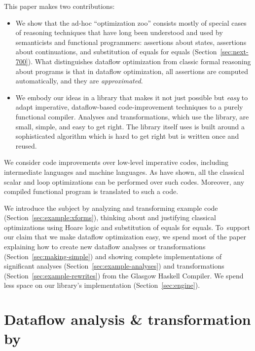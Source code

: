 \documentclass[blockstyle,preprint,natbib,nocopyrightspace]{sigplanconf}
\newcommand\secref[1]{Section~\ref{sec:#1}}
\begin{document}
This paper makes two contributions:
\begin{itemize}
\item
We show that the ad-hoc ``optimization zoo'' consists mostly of special
cases of reasoning techniques that have long been understood and used
by semanticists and functional programmers:
assertions about states, assertions about continuations, and
substitution of equals for equals (\secref{next-700}).
What distinguishes dataflow optimization from classic formal reasoning
about programs is that in dataflow optimization, all assertions are
computed automatically, and they are
\emph{approximated}. 
\item
We embody our ideas in a library that makes it not just
possible but \emph{easy} to adapt imperative, dataflow-based
code-improvement techniques to a purely functional compiler.
Analyses and transformations, which use the library,
are small, simple, and easy to get right.
The library itself
\ifpagetuning uses \else is built around \fi
 a sophisticated algorithm which is
hard to get right but is 
written once and reused.
\end{itemize}

We consider code improvements over low-level
imperative codes, including intermediate languages and machine
languages.
As \citet{benitez-davidson:portable-optimizer} have shown, all the
classical scalar and loop optimizations can be performed over such
codes.
Moreover, any compiled functional program is
translated to such a code.


We introduce the subject by analyzing and transforming example code 
(\secref{example:xforms}),
thinking about and justifying classical optimizations using
Hoare logic and substitution of equals for equals.
To~support our claim that we make dataflow optimization easy, 
we spend most of the paper explaining how
to create new dataflow analyses or transformations
(\secref{making-simple}) and showing complete implementations of significant
analyses (\secref{example-analyses}) and transformations
(\secref{example-rewrites}) from the Glasgow Haskell Compiler.
We spend less space on our library's implementation (\secref{engine}).


\section{Dataflow analysis {\&} transformation by }
\end{document}
